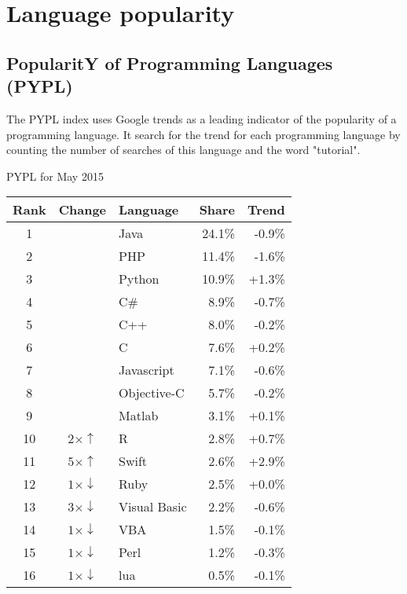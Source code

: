 \section{Language popularity}

\subsection{PopularitY of Programming Languages (PYPL)}
The PYPL index uses Google trends as a leading indicator of the popularity of a programming language.
It search for the trend for each programming language by counting the number of searches of this language and the word "tutorial".



PYPL for May 2015\\
\begin{tabular}{c c l r r}
Rank & Change             & Language        & Share  & Trend   \\ \hline
1    &                    & Java            & 24.1\% & -0.9\%  \\ \hline
2    &                    & PHP             & 11.4\% & -1.6\%  \\ \hline
3    &                    & Python          & 10.9\% & +1.3\%  \\ \hline
4    &                    & C\#             & 8.9\%  & -0.7\%  \\ \hline
5    &                    & C++             & 8.0\%  & -0.2\%  \\ \hline
6    &                    & C               & 7.6\%  & +0.2\%  \\ \hline
7    &                    & Javascript      & 7.1\%  & -0.6\%  \\ \hline
8    &                    & Objective-C     & 5.7\%  & -0.2\%  \\ \hline
9    &                    & Matlab          & 3.1\%  & +0.1\%  \\ \hline
10   & $2\times\uparrow$   & R               & 2.8\%  & +0.7\%  \\ \hline
11   & $5\times\uparrow$   & Swift           & 2.6\%  & +2.9\%  \\ \hline
12   & $1\times\downarrow$ & Ruby            & 2.5\%  & +0.0\%  \\ \hline
13   & $3\times\downarrow$ & Visual Basic    & 2.2\%  & -0.6\%  \\ \hline
14   & $1\times\downarrow$ & VBA             & 1.5\%  & -0.1\%  \\ \hline
15   & $1\times\downarrow$ & Perl            & 1.2\%  & -0.3\%  \\ \hline
16   & $1\times\downarrow$ & lua             & 0.5\%  & -0.1\%  \\ \hline
\end{tabular}



